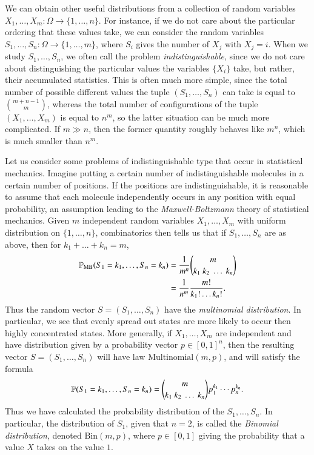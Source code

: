 We can obtain other useful distributions from a collection of random variables $X_1,\dots,X_m: \Omega \to \{ 1, \dots, n \}$. For instance, if we do not care about the particular ordering that these values take, we can consider the random variables $S_1,\dots,S_n: \Omega \to \{ 1, \dots, m \}$, where $S_i$ gives the number of $X_j$ with $X_j = i$. When we study $S_1,\dots,S_n$, we often call the problem \emph{indistinguishable}, since we do not care about distinguishing the particular values the variables $\{ X_i \}$ take, but rather, their accumulated statistics. This is often much more simple, since the total number of possible different values the tuple $(S_1,\dots,S_n)$ can take is equal to ${m+n-1 \choose m}$, whereas the total number of configurations of the tuple $(X_1,\dots,X_m)$ is equal to $n^m$, so the latter situation can be much more complicated. If $m \gg n$, then the former quantity roughly behaves like $m^n$, which is much smaller than $n^m$.

Let us consider some problems of indistinguishable type that occur in statistical mechanics. Imagine putting a certain number of indistinguishable molecules in a certain number of positions. If the positions are indistinguishable, it is reasonable to assume that each molecule independently occurs in any position with equal probability, an assumption leading to the \emph{Maxwell-Boltzmann} theory of statistical mechanics. Given $m$ independent random variables $X_1, \dots, X_m$ with uniform distribution on $\{ 1, \dots, n \}$, combinatorics then tells us that if $S_1,\dots,S_n$ are as above, then for $k_1 + \dots + k_n = m$,
\begin{align*}
    \operatorname{\mathbb{P}}_{\text{MB}}( S_1 = k_1, \dots, S_n = k_n ) &= \frac{1}{m^n} {m \choose k_1\ k_2\ \dots\ k_n}\\
    &= \frac{1}{n^m} \frac{m!}{k_1! \dots k_n!}.
\end{align*}
%
Thus the random vector $S = (S_1,\dots,S_n)$ have the \emph{multinomial distribution}. In particular, we see that evenly spread out states are more likely to occur then highly concentrated states. More generally, if $X_1, \dots, X_m$ are independent and have distribution given by a probability vector $p \in [0,1]^n$, then the resulting vector $S = (S_1,\dots,S_n)$ will have law $\text{Multinomial}(m,p)$, and will satisfy the formula
%
\[ \operatorname{\mathbb{P}}( S_1 = k_1, \dots, S_n = k_n ) = { m \choose k_1\ k_2\ \dots\ k_n } p_1^{k_1} \cdots p_n^{k_n}. \]
%
Thus we have calculated the probability distribution of the $S_1,\dots,S_n$. In particular, the distribution of $S_1$, given that $n = 2$, is called the \emph{Binomial distribution}, denoted $\text{Bin}(m,p)$, where $p \in [0,1]$ giving the probability that a value $X$ takes on the value $1$.

